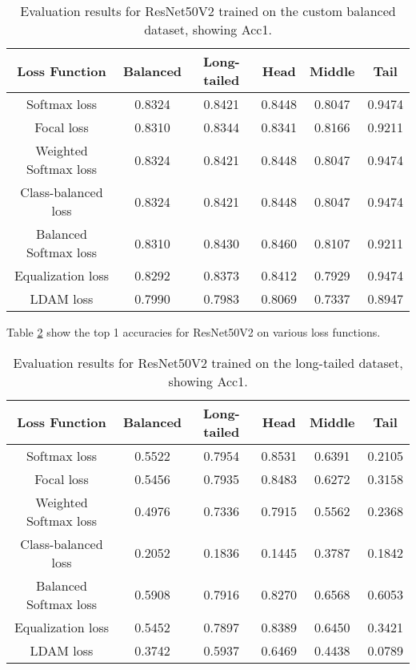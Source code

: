 \begin{table}[H]
    \centering
    \begin{tabular}{cccccc}
        \toprule
        Loss Function & Balanced & Long-tailed & Head & Middle & Tail \\ 
        \midrule
        Softmax loss   & 0.8324  & 0.8421 & 0.8448 & 0.8047 & 0.9474 \\
        Focal loss   & 0.8310  & 0.8344 & 0.8341 & 0.8166 & 0.9211 \\
        Weighted Softmax loss   & 0.8324 & 0.8421 & 0.8448 & 0.8047 & 0.9474 \\
        Class-balanced loss   &  0.8324 & 0.8421 & 0.8448 & 0.8047 & 0.9474 \\
        Balanced Softmax loss   & 0.8310 & 0.8430 & 0.8460 & 0.8107 & 0.9211 \\
        Equalization loss   & 0.8292 & 0.8373 & 0.8412 & 0.7929 & 0.9474 \\
        LDAM loss   & 0.7990 & 0.7983 & 0.8069 & 0.7337 & 0.8947 \\
        \bottomrule
    \end{tabular}
    \caption{Evaluation results for ResNet50V2 trained on the custom balanced dataset, showing Acc1.}
    \label{tab:resnet_bal_acc1_1}
\end{table}

Table \ref{tab:resnet_lt_acc1_1} show the top 1 accuracies for ResNet50V2 on various loss functions.

\begin{table}[H]
    \centering
    \begin{tabular}{cccccc}
        \toprule
        Loss Function & Balanced & Long-tailed & Head & Middle & Tail \\ 
        \midrule
        Softmax loss   & 0.5522 & 0.7954 & 0.8531 & 0.6391 & 0.2105 \\
        Focal loss   & 0.5456 & 0.7935 & 0.8483 & 0.6272 & 0.3158 \\
        Weighted Softmax loss   & 0.4976 & 0.7336 & 0.7915 & 0.5562 & 0.2368 \\
        Class-balanced loss   & 0.2052 & 0.1836 &  0.1445 & 0.3787 & 0.1842 \\
        Balanced Softmax loss   & 0.5908 & 0.7916 & 0.8270 & 0.6568 & 0.6053 \\
        Equalization loss   & 0.5452 & 0.7897 & 0.8389 & 0.6450 & 0.3421 \\
        LDAM loss   & 0.3742 & 0.5937 & 0.6469 & 0.4438 & 0.0789 \\
        \bottomrule
    \end{tabular}
    \caption{Evaluation results for ResNet50V2 trained on the long-tailed dataset, showing Acc1.}
    \label{tab:resnet_lt_acc1_1}
\end{table}

